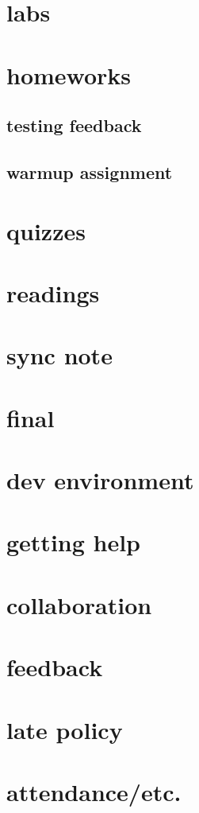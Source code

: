 \section{labs}


\section{homeworks}


\subsection{testing feedback}


\subsection{warmup assignment}


\section{quizzes}


\section{readings}


\section{sync note}


\section{final}


\section{dev environment}


\section{getting help}


\section{collaboration}


\section{feedback}


\section{late policy}


\section{attendance/etc.}

